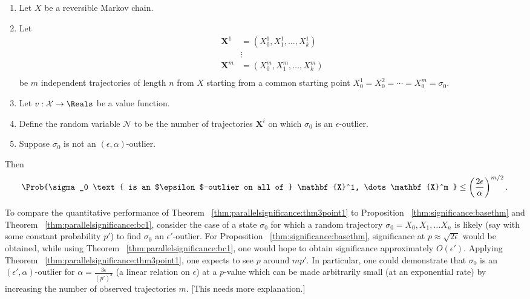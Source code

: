 \documentclass[12pt]{article}
\begin{document}
\begin{corollary}
    \label{cor:parallelsignificance:cor32}
    \begin{enumerate}
        \item
            Let \( X \) be a reversible Markov chain.
        \item
            Let
            \begin{align*}
                \mathbf{X}^1 &= (X_0^1, X_1^1, \dots, X_k^1 )\\
                &\vdots \\
                \mathbf{X}^m &= (X_0^m, X_1^m, \dots, X_k^m )\\
            \end{align*}
            be \( m \) independent trajectories of length \( n \) from \(
            X \) starting from a common starting point \( X_0^1 = X_0^2
            = \cdots = X_0^m = \sigma_0 \).
        \item
            Let \( v :  \mathcal{X} \to \Reals \) be a value function.
        \item
            Define the random variable \( \mathcal{N} \) to be the
            number of trajectories \( \mathbf{X}^i \) on which \( \sigma_0
            \) is an \( \epsilon \)-outlier.
        \item
            Suppose \( \sigma_0 \) is not an \( (\epsilon, \alpha) \)-outlier.
    \end{enumerate}
    Then
    \[
        \Prob{\sigma_0 \text{ is an $\epsilon$-outlier on all of }
        \mathbf {X}^1, \dots \mathbf{X}^m } \le \left( \frac{2\epsilon}{\alpha}
        \right)^{m/2}.
    \]
\end{corollary}

\begin{example}
    To compare the quantitative performance of Theorem~%
    \ref{thm:parallelsignificance:thm3point1} to Proposition~%
    \ref{thm:significance:basethm} and Theorem~%
    \ref{thm:parallelsignificance:bc1}, consider the case of a state \(
    \sigma_0 \) for which a random trajectory \( \sigma_0 = X_0 , X_1 ,
    \dots X_n \) is likely (say with some constant probability \( p' \))
    to find \( \sigma_0 \) an \( \epsilon' \)-outlier.  For Proposition~%
    \ref{thm:significance:basethm}, significance at \( p \approx \sqrt{2\epsilon}
    \) would be obtained, while using Theorem~%
    \ref{thm:parallelsignificance:bc1}, one would hope to obtain
    significance approximately \( O(\epsilon') \).  Applying Theorem~%
    \ref{thm:parallelsignificance:thm3point1}, one expects to see \( p \)
    around \( m p' \).  In particular, one could demonstrate that \(
    \sigma_0 \) is an \( (\epsilon', \alpha) \)-outlier for \( \alpha =
    \frac{3\epsilon} {(p')^2} \) (a linear relation on \( \epsilon \))
    at a \( p \)-value which can be made arbitrarily small (at an
    exponential rate) by increasing the number of observed trajectories \(
    m \).  [This needs more explanation.]
\end{example}
\end{document}
